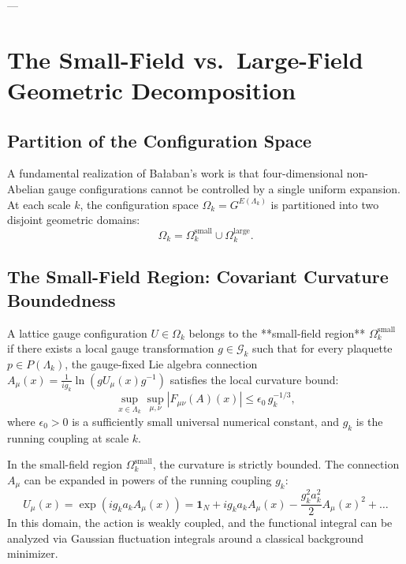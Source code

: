 ---

\section{The Small-Field vs.\ Large-Field Geometric Decomposition}
\label{sec:small_large_field}

\subsection{Partition of the Configuration Space}
\label{subsec:partition_config_space}

A fundamental realization of Ba\l aban's work is that four-dimensional non-Abelian gauge configurations cannot be controlled by a single uniform expansion. At each scale $k$, the configuration space $\Omega_k = G^{E(\Lambda_k)}$ is partitioned into two disjoint geometric domains:
\begin{equation}
\label{eq:ch12_omega_partition}
\Omega_k = \Omega_k^{\mathrm{small}} \cup \Omega_k^{\mathrm{large}}.
\end{equation}

\subsection{The Small-Field Region: Covariant Curvature Boundedness}
\label{subsec:small_field_region}

\begin{definition}
\label{def:small_field_region}
A lattice gauge configuration $U \in \Omega_k$ belongs to the **small-field region** $\Omega_k^{\mathrm{small}}$ if there exists a local gauge transformation $g \in \mathcal{G}_k$ such that for every plaquette $p \in P(\Lambda_k)$, the gauge-fixed Lie algebra connection $A_\mu(x) = \frac{1}{i g_k} \ln(g U_\mu(x) g^{-1})$ satisfies the local curvature bound:
\begin{equation}
\label{eq:ch12_small_field_bound}
\sup_{x \in \Lambda_k} \sup_{\mu, \nu} \left| F_{\mu\nu}(A)(x) \right| \le \epsilon_0 \, g_k^{-1/3},
\end{equation}
where $\epsilon_0 > 0$ is a sufficiently small universal numerical constant, and $g_k$ is the running coupling at scale $k$.
\end{definition}

In the small-field region $\Omega_k^{\mathrm{small}}$, the curvature is strictly bounded. The connection $A_\mu$ can be expanded in powers of the running coupling $g_k$:
\begin{equation}
U_\mu(x) = \exp\left( i g_k a_k A_\mu(x) \right) = \mathbf{1}_N + i g_k a_k A_\mu(x) - \frac{g_k^2 a_k^2}{2} A_\mu(x)^2 + \dots
\end{equation}
In this domain, the action is weakly coupled, and the functional integral can be analyzed via Gaussian fluctuation integrals around a classical background minimizer.

